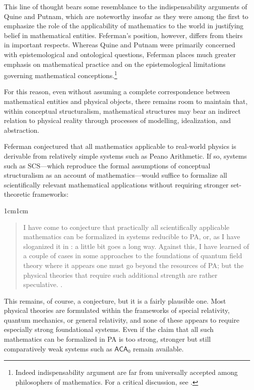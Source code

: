 \documentclass[11pt,a4paper]{book}
\theoremstyle{plain}
\begin{document}
This line of thought bears some resemblance to the indispensability arguments of Quine and Putnam, which are noteworthy insofar as they were among the first to emphasize the role of the applicability of mathematics to the world in justifying belief in mathematical entities. Feferman's position, however, differs from theirs in important respects. Whereas Quine and Putnam were primarily concerned with epistemological and ontological questions, Feferman places much greater emphasis on mathematical practice and on the epistemological limitations governing mathematical conceptions.\footnote{Indeed indispensability argument are far from universally accepted among philosophers of mathematics. For a critical discussion, see \textcite{Maddy1992}.}

For this reason, even without assuming a complete correspondence between mathematical entities and physical objects, there remains room to maintain that, within conceptual structuralism, mathematical structures may bear an indirect relation to physical reality through processes of modelling, idealization, and abstraction.

Feferman conjectured that all mathematics applicable to real-world physics is derivable from relatively simple systems such as Peano Arithmetic. If so, systems such as $\mathrm{SCS}$—which reproduce the formal assumptions of conceptual structuralism as an account of mathematics—would suffice to formalize all scientifically relevant mathematical applications without requiring stronger set-theoretic frameworks:

\begin{adjustwidth}{1cm}{1cm}
\begin{quote}
\small
I have come to conjecture that practically all scientifically applicable mathematics can be formalized in systems reducible to PA, or, as I have sloganized it in \textcite{Feferman1993}: a little bit goes a long way. Against this, I have learned of a couple of cases in some approaches to the foundations of quantum field theory where it appears one must go beyond the resources of PA; but the physical theories that require such additional strength are rather speculative. \textcite[p. 15]{Feferman1999}.
\end{quote}
\end{adjustwidth}

This remains, of course, a conjecture, but it is a fairly plausible one. Most physical theories are formulated within the frameworks of special relativity, quantum mechanics, or general relativity, and none of these appears to require especially strong foundational systems. Even if the claim that all such mathematics can be formalized in PA is too strong, stronger but still comparatively weak systems such as $\mathsf{ACA}_0$ remain available.
\end{document}
